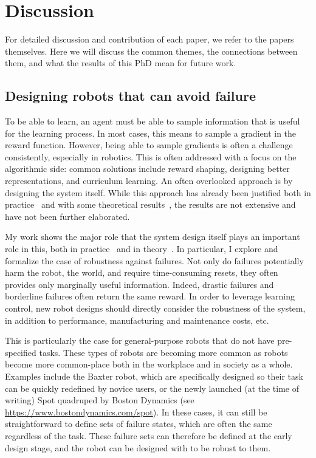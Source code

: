 
\chapter{Discussion}

For detailed discussion and contribution of each paper, we refer to the papers themselves. Here we will discuss the common themes, the connections between them, and what the results of this PhD mean for future work.

\section{Designing robots that can avoid failure}
To be able to learn, an agent must be able to sample information that is useful for the learning process. In most cases, this means to sample a gradient in the reward function.
However, being able to sample gradients is often a challenge consistently, especially in robotics. This is often addressed with a focus on the algorithmic side: common solutions include reward shaping, designing better representations, and curriculum learning. An often overlooked approach is by designing the system itself. While this approach has already been justified both in practice~\cite{tedrake2005learning} and with some theoretical results~\cite{randlov2000shaping}, the results are not extensive and have not been further elaborated. \par
My work shows the major role that the system design itself plays an important role in this, both in practice~\cite{heim2018shaping} and in theory~\cite{heim2019beyond}.
In particular, I explore and formalize the case of robustness against failures. Not only do failures potentially harm the robot, the world, and require time-consuming resets, they often provides only marginally useful information. Indeed, drastic failures and borderline failures often return the same reward. In order to leverage learning control, new robot designs should directly consider the robustness of the system, in addition to performance, manufacturing and maintenance costs, etc. \par
This is particularly the case for general-purpose robots that do not have pre-specified tasks. These types of robots are becoming more common as robots become more common-place both in the workplace and in society as a whole.
Examples include the Baxter robot, which are specifically designed so their task can be quickly redefined by novice users, or the newly launched (at the time of writing) Spot quadruped by Boston Dynamics (see \url{https://www.bostondynamics.com/spot}).
In these cases, it can still be straightforward to define sets of failure states, which are often the same regardless of the task. These failure sets can therefore be defined at the early design stage, and the robot can be designed with to be robust to them. \par


